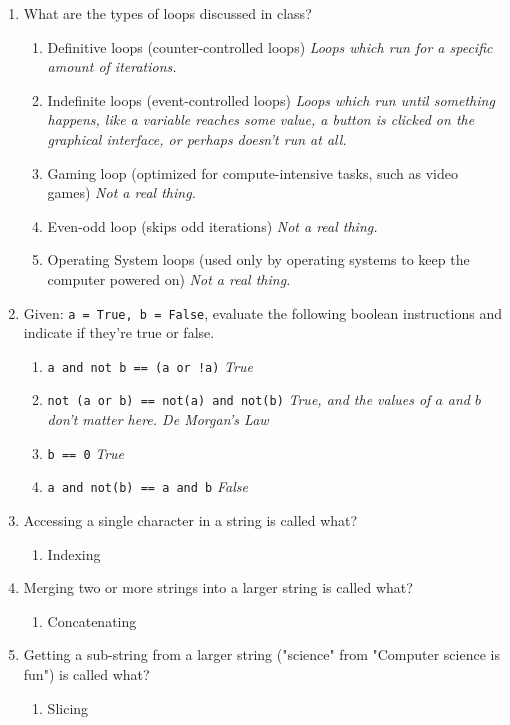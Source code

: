 \documentclass[letter,10pt]{article}
\newcommand*\tick{\item[\Checkmark]}
\newcommand*\fail{\item[\XSolidBrush]}
\begin{document}
\begin{enumerate}
    \item What are the types of loops discussed in class?
    \begin{enumerate}
        \tick Definitive loops (counter-controlled loops) \textit{Loops which run for a specific amount of iterations.}
		\tick Indefinite loops (event-controlled loops) \textit{Loops which run until something happens, like a variable reaches some value, a button is clicked on the graphical interface, or perhaps doesn't run at all.}
		\fail Gaming loop (optimized for compute-intensive tasks, such as video games) \textit{Not a real thing.}
		\fail Even-odd loop (skips odd iterations) \textit{Not a real thing.}
		\fail Operating System loops (used only by operating systems to keep the computer powered on) \textit{Not a real thing.}
    \end{enumerate}

    \item Given: \verb|a = True, b = False|, evaluate the following boolean instructions and indicate if they're true or false.
    \begin{enumerate}
        \item \verb|a and not b == (a or !a)| \textit{True}
        \item \verb|not (a or b) == not(a) and not(b)| \textit{True, and the values of $a$ and $b$ don't matter here. \textit{De Morgan's Law}}
        \item \verb|b == 0| \textit{True}
        \item \verb|a and not(b) == a and b| \textit{False}
    \end{enumerate}

    \item Accessing a single character in a string is called what?
    \begin{enumerate}
        \tick Indexing
    \end{enumerate}

    \item Merging two or more strings into a larger string is called what?
    \begin{enumerate}
        \tick Concatenating
    \end{enumerate}

    \item Getting a sub-string from a larger string ("science" from "Computer science is fun") is called what?
    \begin{enumerate}
        \tick Slicing
    \end{enumerate}


\end{enumerate}
\end{document}
